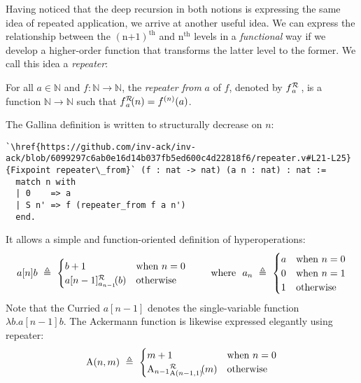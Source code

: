 Having noticed that the deep recursion in both notions is expressing the same idea
of repeated application, we arrive at another useful idea. We can express the relationship
between the $(\text{n+1})^{\text{th}}$ and $\text{n}^{\text{th}}$ levels in
a \emph{functional} way if we develop a higher-order function that transforms the latter level
to the former.  We call this idea a \emph{repeater}:
\begin{defn}
For all $a\in \mathbb{N}$ and $f: \mathbb{N}\to \mathbb{N}$, the \emph{repeater from} $a$ of $f$, denoted by $\rf{f}{a}$ , is a function $\mathbb{N}\to \mathbb{N}$ such that $\rf{f}{a}(n) = f^{(n)}(a)$.
\end{defn}
The Gallina definition is written to structurally decrease on $n$:
\begin{lstlisting}
`\href{https://github.com/inv-ack/inv-ack/blob/6099297c6ab0e16d14b037fb5ed600c4d22818f6/repeater.v#L21-L25}{Fixpoint repeater\_from}` (f : nat -> nat) (a n : nat) : nat :=
  match n with
  | 0    => a
  | S n' => f (repeater_from f a n')
  end.
\end{lstlisting}
 It allows a simple and function-oriented definition of hyperoperations:
\begin{equation*}
a[n]b ~ \triangleq ~ \begin{cases}
b + 1 & \text{when } n = 0 \\
\rf{a[n-1]}{a_{n-1}}(b) & \text{otherwise}
\end{cases}
\qquad \text{ where } \ a_n ~ \triangleq ~ \begin{cases}
a & \text{when } n = 0 \\
0 & \text{when } n = 1 \\
1 & \text{otherwise}
\end{cases}
\end{equation*}
Note that the Curried $a[n-1]$ denotes the single-variable 
function $\lambda b.a[n-1]b$.
The Ackermann function is likewise expressed elegantly using repeater:
\begin{equation*}
\Ack(n,m) ~ \triangleq ~ \begin{cases}
m + 1 & \text{when } n = 0 \\
\rf{\Ack_{n-1}}{\Ack(n-1,1)}(m) & \text{otherwise}
\end{cases}
\end{equation*}

